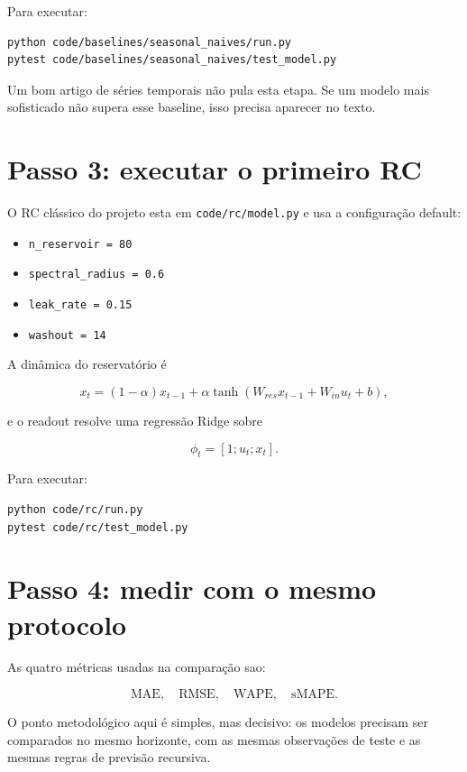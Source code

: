 \documentclass[12pt]{article}
\providecommand{\tightlist}{%
          \setlength{\itemsep}{0pt}\setlength{\parskip}{0pt}}
\begin{document}
Para executar:

\begin{verbatim}
python code/baselines/seasonal_naives/run.py
pytest code/baselines/seasonal_naives/test_model.py
\end{verbatim}

Um bom artigo de séries temporais não pula esta etapa. Se um modelo mais sofisticado não supera esse baseline, isso precisa aparecer no texto.

\section{Passo 3: executar o primeiro RC}\label{5-passo-3-executar-o-primeiro-rc}

O RC clássico do projeto esta em \texttt{code/rc/model.py} e usa a configuração default:

\begin{itemize}
\tightlist
\item
  \texttt{n\_reservoir\ =\ 80}
\item
  \texttt{spectral\_radius\ =\ 0.6}
\item
  \texttt{leak\_rate\ =\ 0.15}
\item
  \texttt{washout\ =\ 14}
\end{itemize}

A dinâmica do reservatório é

\[
x_t = (1 - \alpha) x_{t-1} + \alpha \tanh(W_{res} x_{t-1} + W_{in} u_t + b),
\]

e o readout resolve uma regressão Ridge sobre

\[
\phi_t = [1; u_t; x_t].
\]

Para executar:

\begin{verbatim}
python code/rc/run.py
pytest code/rc/test_model.py
\end{verbatim}

\section{Passo 4: medir com o mesmo protocolo}\label{6-passo-4-medir-com-o-mesmo-protocolo}

As quatro métricas usadas na comparação sao:

\[
\mathrm{MAE},\quad \mathrm{RMSE},\quad \mathrm{WAPE},\quad \mathrm{sMAPE}.
\]

O ponto metodológico aqui é simples, mas decisivo: os modelos precisam ser comparados no mesmo horizonte, com as mesmas observações de teste e as mesmas regras de previsão recursiva.
\end{document}

